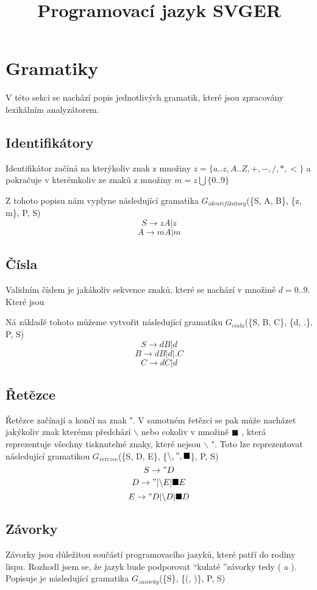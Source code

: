 \documentclass[a4paper,11pt]{article}
\title{Programovací jazyk SVGER}
\begin{document}
\maketitle

\newpage
\tableofcontents

\newpage
\section{Gramatiky}
V této sekci se nachází popis jednotlivých gramatik, které jsou zpracovány lexikálním analyzátorem.

\subsection{Identifikátory}
Identifikátor začíná na kterýkoliv znak z množiny $z = \{a..z, A..Z, +, -, /, *, <\}$
a pokračuje v kterémkoliv ze znaků z množiny $m = z \bigcup \{0..9\}$ 
\linebreak

Z tohoto popisu nám vyplyne následující gramatika $G_{identifikatory}$(\{S, A, B\}, \{z, m\}, P, S)
$$S \rightarrow zA | z$$
$$A \rightarrow mA | m$$

\subsection{Čísla}
Validním číslem je jakákoliv sekvence znaků, které se nachází v množině $d = {0..9}$. Které jsou

Ná základě tohoto můžeme vytvořit následující gramatiku
$G_{cisla}$(\{S, B, C\}, \{d, .\}, P, S)
$$S \rightarrow dB | d$$
$$B \rightarrow dB | d | .C$$
$$C \rightarrow dC | d$$

\subsection{Řetězce}
Řetězce začínají a končí na znak ". V samotném řetězci se pak může nacházet jakýkoliv znak kterému   předchází $\backslash$ nebo cokoliv v množině $\blacksquare$
 , která reprezentuje všechny tisknutelné znaky, které nejsou $\backslash$ ".
Toto lze reprezentovat následující gramatikou $G_{retezce}$(\{S, D, E\}, \{$\backslash, ", \blacksquare$\}, P, S)
$$S \rightarrow "D$$
$$D \rightarrow " | \backslash E | \blacksquare E$$
$$E \rightarrow "D | \backslash D | \blacksquare D$$

\subsection{Závorky}
Závorky jsou důležitou součástí programovacího jazyků, které patří do rodiny lispu. Rozhodl jsem se, že jazyk bude podporovat \textquotedblleft kulaté \textquotedblright  závorky tedy ( a ). Popisuje je následující gramatika $G_{zavorky}$(\{S\}, \{(, )\}, P, S)
\end{document}
